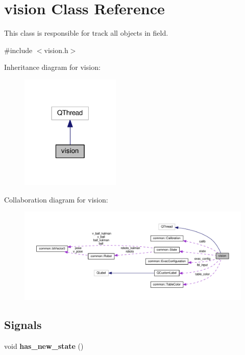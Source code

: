 \hypertarget{classvision}{}\section{vision Class Reference}
\label{classvision}


This class is responsible for track all objects in field.  




{\ttfamily \#include $<$vision.\+h$>$}



Inheritance diagram for vision\+:\nopagebreak
\begin{figure}[H]
\begin{center}
\leavevmode
\includegraphics[width=134pt]{classvision__inherit__graph}
\end{center}
\end{figure}


Collaboration diagram for vision\+:\nopagebreak
\begin{figure}[H]
\begin{center}
\leavevmode
\includegraphics[width=350pt]{classvision__coll__graph}
\end{center}
\end{figure}
\subsection*{Signals}
\begin{DoxyCompactItemize}
\item 
void {\bfseries has\+\_\+new\+\_\+state} ()\hypertarget{classvision_aa218dcf92d5b787ce59f5fd66ced8967}{}\label{classvision_aa218dcf92d5b787ce59f5fd66ced8967}

\end{DoxyCompactItemize}

